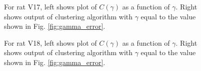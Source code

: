 \documentclass[superscriptaddress, twocolumn, prl]{revtex4}
\begin{document}
\begin{figure}
\centering
{}
\caption{For rat V17, left shows plot of $C\left(\gamma \right)$ as a function of $\gamma$. Right shows output of clustering algorithm with $\gamma$ equal to the value shown in Fig. \ref{fig:gamma_error}.}
\end{figure}

\begin{figure}
\centering
{}
\caption{For rat V18, left shows plot of $C\left(\gamma \right)$ as a function of $\gamma$. Right shows output of clustering algorithm with $\gamma$ equal to the value shown in Fig. \ref{fig:gamma_error}.}
\end{figure}
\end{document}
